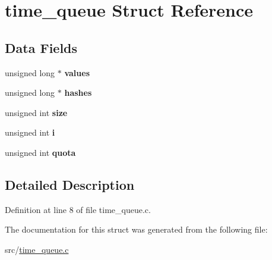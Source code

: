 \hypertarget{structtime__queue}{\section{time\-\_\-queue Struct Reference}
\label{structtime__queue}
}
\subsection*{Data Fields}
\begin{DoxyCompactItemize}
\item 
\hypertarget{structtime__queue_aede0f371f8ae284d87b2c8f26c591dd6}{unsigned long $\ast$ {\bfseries values}}\label{structtime__queue_aede0f371f8ae284d87b2c8f26c591dd6}

\item 
\hypertarget{structtime__queue_af591891fd019fc3b191755d251a8c713}{unsigned long $\ast$ {\bfseries hashes}}\label{structtime__queue_af591891fd019fc3b191755d251a8c713}

\item 
\hypertarget{structtime__queue_a783231ea41dbc7fdd60fea5438fa439f}{unsigned int {\bfseries size}}\label{structtime__queue_a783231ea41dbc7fdd60fea5438fa439f}

\item 
\hypertarget{structtime__queue_ab76a94f19133359e272e3836d1fe05df}{unsigned int {\bfseries i}}\label{structtime__queue_ab76a94f19133359e272e3836d1fe05df}

\item 
\hypertarget{structtime__queue_a8d04cb0edc950d79d70eed6d3dafc5e7}{unsigned int {\bfseries quota}}\label{structtime__queue_a8d04cb0edc950d79d70eed6d3dafc5e7}

\end{DoxyCompactItemize}


\subsection{Detailed Description}


Definition at line 8 of file time\-\_\-queue.\-c.



The documentation for this struct was generated from the following file\-:\begin{DoxyCompactItemize}
\item 
src/\hyperlink{time__queue_8c}{time\-\_\-queue.\-c}\end{DoxyCompactItemize}
